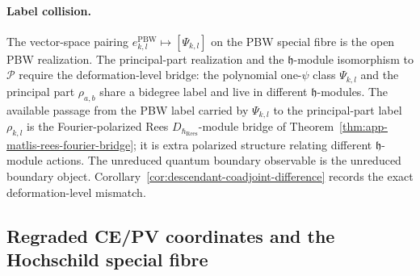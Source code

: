 \documentclass[11pt]{memoir}
\begin{document}
\paragraph{Label collision.}
The vector-space pairing
\(e^{\mathrm{PBW}}_{k,l}\mapsto[\Psi_{k,l}]\) on the PBW special fibre
is the open PBW realization.  The principal-part realization and the
\(\mathfrak h\)-module isomorphism to \(\mathcal P\) require the
deformation-level bridge: the polynomial
one-\(\psi\) class \(\Psi_{k,l}\) and the principal part \(\rho_{a,b}\)
share a bidegree label and live in different \(\mathfrak h\)-modules.
The available passage from the PBW label carried by \(\Psi_{k,l}\) to
the principal-part label \(\rho_{k,l}\) is the Fourier-polarized Rees
\(D_{\hbar_{\mathrm{Rees}}}\)-module bridge of
Theorem~\ref{thm:app-matlis-rees-fourier-bridge}; it is extra polarized
structure relating different \(\mathfrak h\)-module actions.  The
unreduced quantum boundary observable is the unreduced boundary object.
Corollary~\ref{cor:descendant-coadjoint-difference} records the exact
deformation-level mismatch.

\subsection{\texorpdfstring{Regraded CE/PV coordinates and the Hochschild special fibre}{Regraded CE/PV coordinates and the Hochschild special fibre}}
\label{ssec:coordinate-free-ce-pv-synthesis}
\end{document}
